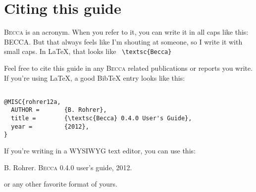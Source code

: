 \chapter{Citing this guide}

\textsc{Becca} is an acronym. When you refer to it, you can write it in all caps like this: BECCA. But that always feels like I'm shouting at someone, so I write it with small caps. In \LaTeX, that looks like \verb+ \textsc{Becca} +

Feel free to cite this guide in any \textsc{Becca} related publications or reports you write. If you're using \LaTeX, a good BibTeX entry looks like this:

\begin{verbatim}

@MISC{rohrer12a,
  AUTHOR =       {B. Rohrer},
  title =        {\textsc{Becca} 0.4.0 User's Guide},
  year =         {2012},
}

\end{verbatim}

If you're writing in a WYSIWYG text editor, you can use this:

B. Rohrer. \textsc{Becca} 0.4.0 user's guide, 2012.

or any other favorite format of yours. 



 
